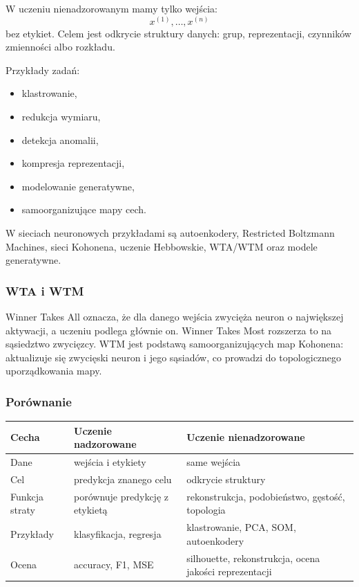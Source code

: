 W uczeniu nienadzorowanym mamy tylko wejścia:
\[
x^{(1)},\dots,x^{(n)}
\]
bez etykiet. Celem jest odkrycie struktury danych: grup, reprezentacji, czynników zmienności albo rozkładu.

Przykłady zadań:
\begin{itemize}
  \item klastrowanie,
  \item redukcja wymiaru,
  \item detekcja anomalii,
  \item kompresja reprezentacji,
  \item modelowanie generatywne,
  \item samoorganizujące mapy cech.
\end{itemize}

W sieciach neuronowych przykładami są autoenkodery, Restricted Boltzmann Machines, sieci Kohonena, uczenie Hebbowskie, WTA/WTM oraz modele generatywne.

\subsubsection{WTA i WTM}

Winner Takes All oznacza, że dla danego wejścia zwycięża neuron o największej aktywacji, a uczeniu podlega głównie on. Winner Takes Most rozszerza to na sąsiedztwo zwycięzcy. WTM jest podstawą samoorganizujących map Kohonena: aktualizuje się zwycięski neuron i jego sąsiadów, co prowadzi do topologicznego uporządkowania mapy.

\subsubsection{Porównanie}

\begin{longtable}{p{}p{}p{}}
\toprule
Cecha & Uczenie nadzorowane & Uczenie nienadzorowane \\
\midrule
Dane & wejścia i etykiety & same wejścia \\
Cel & predykcja znanego celu & odkrycie struktury \\
Funkcja straty & porównuje predykcję z etykietą & rekonstrukcja, podobieństwo, gęstość, topologia \\
Przykłady & klasyfikacja, regresja & klastrowanie, PCA, SOM, autoenkodery \\
Ocena & accuracy, F1, MSE & silhouette, rekonstrukcja, ocena jakości reprezentacji \\
\bottomrule
\end{longtable}

